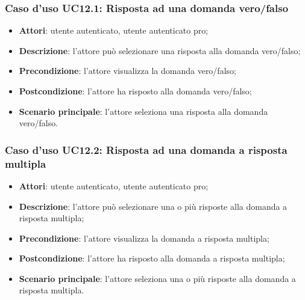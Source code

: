 \subsubsection{Caso d'uso UC12.1: Risposta ad una domanda vero/falso}
\begin{itemize}
\item \textbf{Attori}: utente autenticato, utente autenticato pro;
\item \textbf{Descrizione}: l'attore può selezionare una risposta alla domanda vero/falso;
\item \textbf{Precondizione}: l'attore visualizza la domanda vero/falso;
\item \textbf{Postcondizione}: l'attore ha risposto alla domanda vero/falso;
\item \textbf{Scenario principale}: l'attore seleziona una risposta alla domanda vero/falso.
\end{itemize}

\subsubsection{Caso d'uso UC12.2: Risposta ad una domanda a risposta multipla}
\begin{itemize}
\item \textbf{Attori}: utente autenticato, utente autenticato pro;
\item \textbf{Descrizione}: l'attore può selezionare una o più risposte alla domanda a risposta multipla;
\item \textbf{Precondizione}: l'attore visualizza la domanda a risposta multipla;
\item \textbf{Postcondizione}: l'attore ha risposto alla domanda a risposta multipla;
\item \textbf{Scenario principale}: l'attore seleziona una o più risposte alla domanda a risposta multipla.
\end{itemize}

